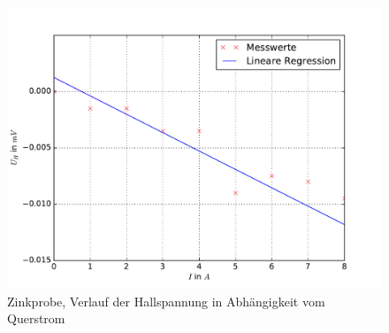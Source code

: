\begin{figure}
  \centering
  \includegraphics[width=\textwidth]{pics/u_h_zink_konstB.pdf}
  \caption{Zinkprobe, Verlauf der Hallspannung in Abhängigkeit vom Querstrom}
  \label{fig: uh_konstB_zink}
\end{figure}


